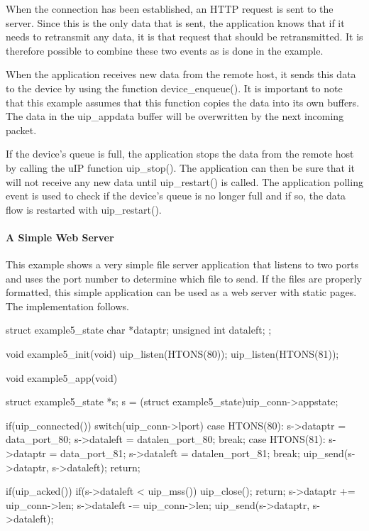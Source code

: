 \-When the connection has been established, an \-H\-T\-T\-P request is sent to the server. \-Since this is the only data that is sent, the application knows that if it needs to retransmit any data, it is that request that should be retransmitted. \-It is therefore possible to combine these two events as is done in the example.

\-When the application receives new data from the remote host, it sends this data to the device by using the function device\-\_\-enqueue(). \-It is important to note that this example assumes that this function copies the data into its own buffers. \-The data in the uip\-\_\-appdata buffer will be overwritten by the next incoming packet.

\-If the device's queue is full, the application stops the data from the remote host by calling the u\-I\-P function uip\-\_\-stop(). \-The application can then be sure that it will not receive any new data until uip\-\_\-restart() is called. \-The application polling event is used to check if the device's queue is no longer full and if so, the data flow is restarted with uip\-\_\-restart().\hypertarget{a00060_example5}{}\paragraph{\-A Simple Web Server}\label{a00060_example5}
\-This example shows a very simple file server application that listens to two ports and uses the port number to determine which file to send. \-If the files are properly formatted, this simple application can be used as a web server with static pages. \-The implementation follows.


\begin{DoxyCode}
struct example5_state {
   char *dataptr;
   unsigned int dataleft;
};

void example5_init(void) {
   uip_listen(HTONS(80));
   uip_listen(HTONS(81));
}

void example5_app(void) {
   struct example5_state *s;
   s = (struct example5_state)uip_conn->appstate;
   
   if(uip_connected()) {
      switch(uip_conn->lport) {
      case HTONS(80):
         s->dataptr = data_port_80;
         s->dataleft = datalen_port_80;
         break;
      case HTONS(81):
         s->dataptr = data_port_81;
         s->dataleft = datalen_port_81;
         break;
      }
      uip_send(s->dataptr, s->dataleft);
      return;      
   }

   if(uip_acked()) {
      if(s->dataleft < uip_mss()) {
         uip_close();
         return;
      }
      s->dataptr += uip_conn->len;
      s->dataleft -= uip_conn->len;
      uip_send(s->dataptr, s->dataleft);      
   }
}
\end{DoxyCode}



